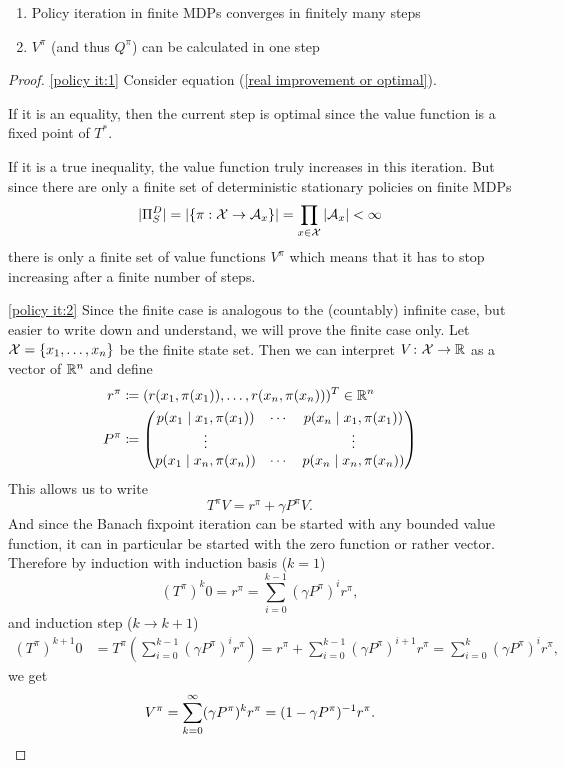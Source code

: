 \begin{corollary}\leavevmode
	\begin{enumerate}[label=(\roman*), font=\normalfont]
		\item\label{policy it:1} Policy iteration in finite MDPs converges in finitely many steps
		\item\label{policy it:2} \(V^\pi\) (and thus \(Q^\pi\)) can be calculated in one step 
   \end{enumerate}
\end{corollary}
\begin{proof}
	\ref{policy it:1} \parencite{szepesvariAlgorithmsReinforcementLearning2010} Consider equation (\ref{real improvement or optimal}). 
	
	If it is an equality, then the current step is optimal since the value function is a fixed point of \(T^*\). 
	
	If it is a true inequality, the value function truly increases in this iteration. 
	But since there are only a finite set of deterministic stationary policies on finite MDPs
	\[
		|\Pi_S^D| = |\{\pi:\mathcal{X}\to \mathcal{A}_x\}| = \prod_{x\in\mathcal{X}} |\mathcal{A}_x | < \infty
	\]
	there is only a finite set of value functions \(V^\pi\) which means that it has to stop increasing after a finite number of steps. 

	\ref{policy it:2} Since the finite case is analogous to the (countably) infinite case, but easier to write down and understand, we will prove the finite case only. Let \(\mathcal{X} = \{x_1,\dots,x_n\}\) be the finite state set. Then we can interpret \(V\colon \mathcal{X}\to \mathbb{R}\) as a vector of \(\mathbb{R}^n\) and define
 	\begin{align*}
		r^\pi &\coloneqq (r(x_1,\pi(x_1)),\dots, r(x_n,\pi(x_n)))^T \in \mathbb{R}^n\\
		P^\pi &\coloneqq 
		\begin{pmatrix}
			p(x_1 \mid x_1,\pi(x_1)) & \cdots & p(x_n \mid x_1, \pi(x_1))\\
			\vdots & & \vdots\\
			p(x_1 \mid x_n,\pi(x_n)) & \cdots & p(x_n \mid x_n, \pi(x_n))
		\end{pmatrix}
	\end{align*}
	This allows us to write
	\[
		   T^\pi V= r^\pi +\gamma P^\pi V.
	\]
	And since the Banach fixpoint iteration can be started with any bounded value function, it can in particular be started with the zero function or rather vector. Therefore by induction with induction basis (\(k=1\))
	\[
		(T^\pi)^k 0 = r^\pi = \sum_{i=0}^{k-1} (\gamma P^\pi)^i r^\pi,
	\]
	and induction step (\(k\to k+1\))
	\begin{align*}
		(T^\pi)^{k+1} 0 &= T^\pi \left(\sum_{i=0}^{k-1} (\gamma P^\pi)^i r^{\pi}\right)
		= r^\pi + \sum_{i=0}^{k-1} (\gamma P^\pi)^{i+1} r^\pi
		= \sum_{i=0}^{k} (\gamma P^\pi)^{i} r^\pi,
	\end{align*}
	we get
	\[
		V^\pi = \sum_{k=0}^\infty (\gamma P^\pi)^k r^\pi = (1-\gamma P^\pi)^{-1} r^\pi. \qedhere
	\]
\end{proof}







\endinput